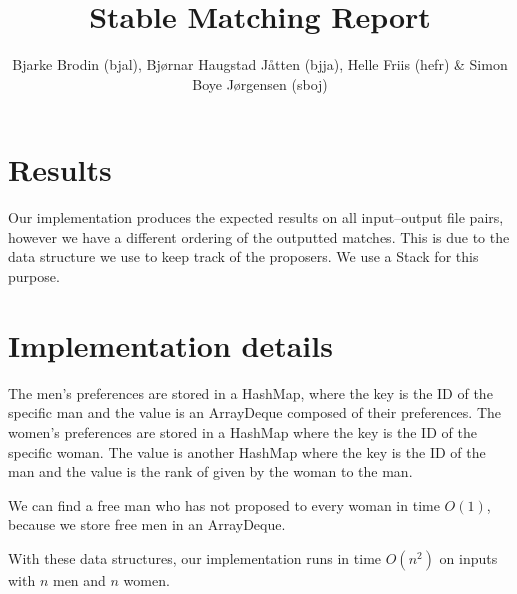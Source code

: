 \documentclass{tufte-handout}
\title{Stable Matching Report}
\author{Bjarke Brodin (bjal), Bjørnar Haugstad Jåtten (bjja), Helle Friis (hefr) & Simon Boye Jørgensen (sboj)}
\begin{document}
  \maketitle

  \section{Results}

  Our implementation produces the expected results on all input--output file pairs, however we have a different ordering of the outputted matches.
  This is due to the data structure we use to keep track of the proposers. We use a Stack for this purpose.

  \section{Implementation details}

  The men's preferences are stored in a HashMap, where the key is the ID of the specific man and the value is an ArrayDeque composed of their preferences.
  The women's preferences are stored in a HashMap where the key is the ID of the specific woman. 
  The value is another HashMap where the key is the ID of the man and the value is the rank of given by the woman to the man.

  We can find a free man who has not proposed to every woman in time $O(1)$,
  because we store free men in an ArrayDeque.

  With these data structures, our implementation runs in time $O(n^2)$ on inputs with $n$ men and $n$ women.
\end{document}
